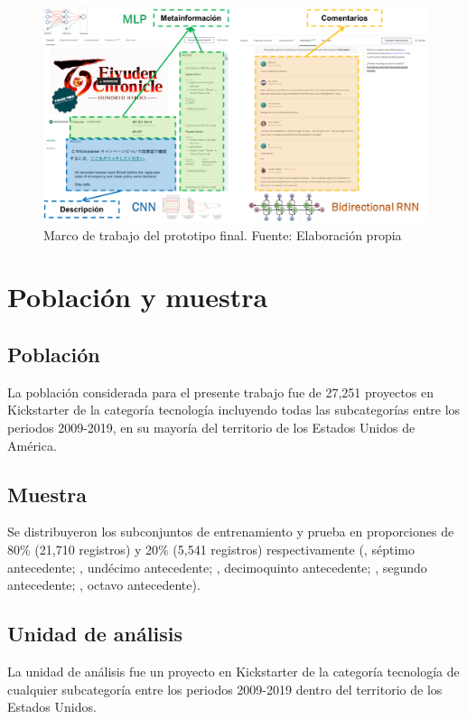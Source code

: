 \begin{figure}[htbp]
	\begin{center}
		\includegraphics[width=1\textwidth]{3/figures/framework.png}
		\caption{Marco de trabajo del prototipo final. Fuente: Elaboración propia}
		\label{3:fig1}
	\end{center}
\end{figure}

\section{Población y muestra}

\subsection{Población}
La población considerada para el presente trabajo fue de 27,251 proyectos en Kickstarter de la categoría tecnología incluyendo todas las subcategorías entre los periodos 2009-2019, en su mayoría del territorio de los Estados Unidos de América.

\subsection{Muestra}
Se distribuyeron los subconjuntos de entrenamiento y prueba en proporciones de 80\% (21,710 registros) y 20\% (5,541 registros) respectivamente (\cite{pr_yuan2016textanalytics}, séptimo antecedente; \cite{pr_yu2018deeplearning}, undécimo antecedente; \cite{pr_chen2019keywords_crowdfunding}, decimoquinto antecedente; \cite{pr_mitra2014phrases}, segundo antecedente; \cite{pr_sawhney2016usingLT}, octavo antecedente).

\subsection{Unidad de análisis}
La unidad de análisis fue un proyecto en Kickstarter de la categoría tecnología de cualquier subcategoría entre los periodos 2009-2019 dentro del territorio de los Estados Unidos.

